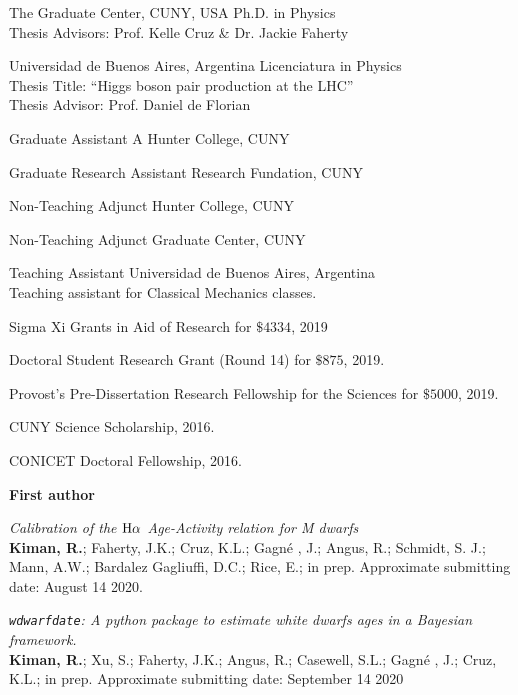 \documentclass[10pt]{cv}
\begin{document}
\begin{llist}

The Graduate Center, CUNY, USA
Ph.D. in Physics\\
Thesis Advisors: Prof. Kelle Cruz \& Dr. Jackie Faherty

Universidad de Buenos Aires, Argentina
Licenciatura in Physics\\
Thesis Title: ``Higgs boson pair production at the LHC''\\
Thesis Advisor: Prof. Daniel de Florian


Graduate Assistant A
Hunter College, CUNY

Graduate Research Assistant
Research Fundation, CUNY

Non-Teaching Adjunct
Hunter College, CUNY

Non-Teaching Adjunct
Graduate Center, CUNY

Teaching Assistant
Universidad de Buenos Aires, Argentina\\
Teaching assistant for Classical Mechanics classes.


Sigma Xi Grants in Aid of Research for $\$4334$, 2019

Doctoral Student Research Grant (Round 14) for $\$875$, 2019.

Provost’s Pre-Dissertation Research Fellowship for the Sciences for $\$5000$, 2019.

CUNY Science Scholarship, 2016.

CONICET Doctoral Fellowship, 2016.



\textbf{First author}

\textit{Calibration of the ${\rm H}\alpha$ Age-Activity relation for M dwarfs}\\
\textbf{Kiman, R.}; Faherty, J.K.; Cruz, K.L.; Gagn\'e , J.; Angus, R.; Schmidt, S. J.; Mann, A.W.; Bardalez Gagliuffi, D.C.; Rice, E.; in prep. Approximate submitting date: August 14 2020. 

\textit{\texttt{wdwarfdate}: A python package to estimate white dwarfs ages in a Bayesian framework.}\\
\textbf{Kiman, R.}; Xu, S.; Faherty, J.K.; Angus, R.; Casewell, S.L.; Gagn\'e , J.; Cruz, K.L.; in prep. Approximate submitting date: September 14 2020


\end{llist}
\end{document}
